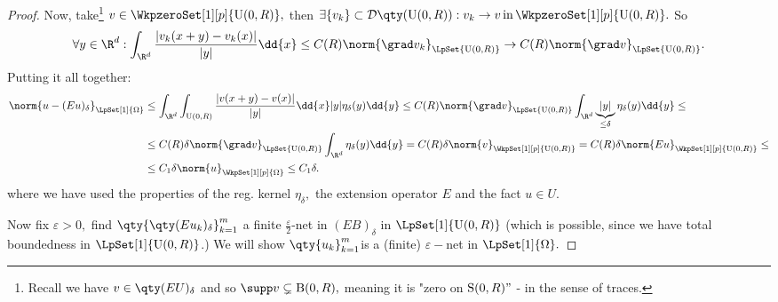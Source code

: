 \begin{proof}
	Now, take\footnote{Recall we have $v \in \qty(EU)_{\delta}$ and so $\supp v \subsetneq \text{B}(0,R),$ meaning it is "zero on $\text{S}(0,R)"$ - in the sense of traces.} $v \in \WkpzeroSet[1][p]{\text{U}(0,R)}, $ then $\exists \{v_k\} \subset \mathcal{D}\qty(\text{U}(0,R)): v_k \to v \, \text{in} \, \WkpzeroSet[1][p]{\text{U}(0,R)}.$ So
	\[
		\forall y \in \R^d: \int_{\R^d}\frac{|v_k(x+y)-v_k(x)|}{|y|}\dd{x}\leq C(R) \norm{\grad v_k}_{\LpSet{\text{U}(0,R)}}\to C(R) \norm{\grad v}_{\LpSet{\text{U}(0,R)}}.
	\]
	Putting it all together:
	\begin{align*}
		\norm{u-(Eu)_{\delta}}_{\LpSet[1]{\Omega}} &\leq \int_{\R^d}\int_{\text{U}(0,R)}\frac{|v(x+y)-v(x)|}{|y|}\dd{x} |y| \eta_{\delta}(y)\dd{y} \leq C(R) \norm{\grad v}_{\LpSet{\text{U}(0,R)}} \int_{\R^d}\underbrace{|y|}_{\leq \delta} \eta_{\delta}(y)\dd{y} \leq \\
		&\leq C(R) \delta \norm{\grad v}_{\LpSet{\text{U}(0,R)}}\int_{\R^{d}}\eta_{\delta}(y)\dd{y} = C(R) \delta \norm{v}_{\WkpSet[1][p]{\text{U}(0,R)}} = C(R) \delta \norm{Eu}_{\WkpSet[1][p]{\text{U}(0,R)}} \leq \\
		&\leq C_1 \delta \norm{u}_{\WkpSet[1][p]{\Omega}} \leq C_1 \delta.
	\end{align*}
	where we have used the properties of the reg. kernel $\eta_{\delta},$ the extension operator $E$ and the fact $u \in U.$

	Now fix $\varepsilon >0, $ find $\qty{\qty(Eu_k)_{\delta}}_{k=1}^m$ a finite $\frac{\varepsilon}{2}$-net in $(EB)_{\delta}$ in $\LpSet[1]{\text{U}(0,R)}$ (which is possible, since we have total boundedness in $\LpSet[1]{\text{U}(0,R)}$.) We will show $\qty{u_k}_{k=1}^m$is a (finite) $\varepsilon-$net in $\LpSet[1]{\Omega}.$


\end{proof}
